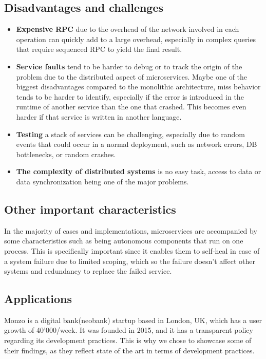 \subsection*{Disadvantages and challenges}
\begin{itemize}
\item \textbf{Expensive RPC} due to the overhead of the network involved in each operation can quickly add to a large overhead, especially in complex queries that require sequenced RPC to yield the final result\cite{viggiato}.
\item \textbf{Service faults} tend to be harder to debug or to track the origin of the problem due to the distributed aspect of microservices\cite{viggiato}. Maybe one of the biggest disadvantages compared to the monolithic architecture, miss behavior tends to be harder to identify, especially if the error is introduced in the runtime of another service than the one that crashed. This becomes even harder if that service is written in another language.
\item \textbf{Testing} a stack of services can be challenging, especially due to random events that could occur in a normal deployment, such as network errors, DB bottlenecks, or random crashes\cite{viggiato}.
\item \textbf{The complexity of distributed systems} is no easy task, access to data or data synchronization being one of the major problems\cite{viggiato}.
\end{itemize}

\subsection*{Other important characteristics}
In the majority of cases and implementations, microservices are accompanied by some characteristics such as being autonomous components that run on one process\cite{hassan}. This is specifically important since it enables them to self-heal in case of a system failure due to limited scoping, which so the failure doesn't affect other systems and redundancy to replace the failed service.

\subsection*{Applications}
Monzo is a digital bank(neobank) startup based in London, UK, which has a user growth of 40'000/week\cite{monzo}. It was founded in 2015, and it has a transparent policy regarding its development practices. This is why we chose to showcase some of their findings, as they reflect state of the art in terms of development practices.

